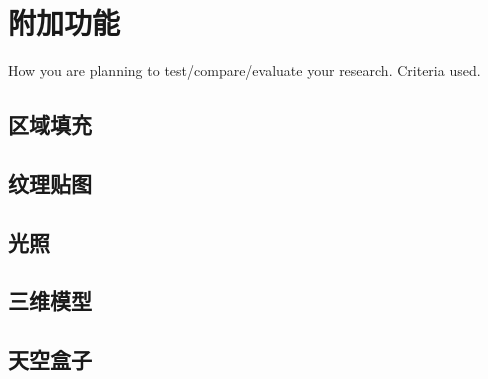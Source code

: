 

    \chapter{附加功能}

    How you are planning to test/compare/evaluate your research.
    Criteria used.

    \section{区域填充}

    \section{纹理贴图}
    
    \section{光照}
    
    \section{三维模型}
    
    \section{天空盒子}

